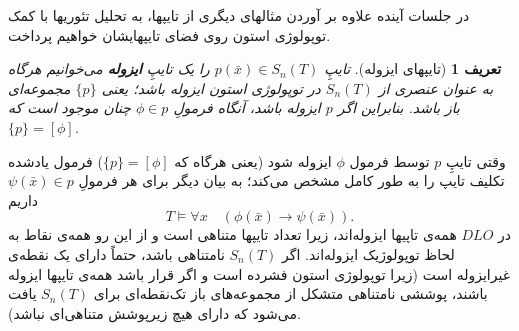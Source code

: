 \documentclass[12pt,a4paper]{report}
\theoremstyle{colorhead}
\newtheorem{defn}[thm]{تعریف}
\begin{document}
در جلسات آینده علاوه بر آوردن مثالهای دیگری از تایپها، به تحلیل تئوریها 
با کمک توپولوژی استون روی فضای تایپهایشان خواهیم پرداخت. 
\begin{defn}[تایپهای ایزوله]
تایپِ
$p(\bar{x})\in S_n(T)$
را یک تایپِ
\textbf{ایزوله}
می‌خوانیم هرگاه به عنوان عنصری از
$S_n(T)$
در توپولوژی استون ایزوله باشد؛ یعنی
$\{p\}$
مجموعه‌ای باز باشد. بنابراین اگر
$p$
ایزوله باشد، آنگاه فرمولِ
$\phi\in p$
چنان موجود است که 
$\{p\}=[\phi]$.
\end{defn}
وقتی تایپِ
$p$
توسط فرمول
$\phi$
ایزوله شود (یعنی هرگاه که 
$\{p\}=[\phi]$)
فرمول یادشده تکلیف تایپ را به طور کامل مشخص می‌کند؛ به بیان دیگر برای هر فرمولِ
$\psi(\bar{x})\in p$
داریم
\[
T\models \forall x\quad (\phi(\bar{x})\to \psi(\bar{x})).
\]
در
$DLO$
همه‌ی تاپیها ایزوله‌اند، زیرا تعداد تایپها متناهی است و از این رو همه‌ی نقاط به لحاظ توپولوژیک ایزوله‌اند. 
اگر
$S_n(T)$
نامتناهی باشد، حتماً دارای یک نقطه‌ی غیرایزوله است (زیرا توپولوژی استون فشرده است و اگر قرار باشد همه‌ی تایپها ایزوله باشند، پوششی نامتناهی  متشکل از 
مجموعه‌های باز تک‌نقطه‌ای برای
$S_n(T)$
یافت می‌شود که دارای هیچ‌ زیرپوشش متناهی‌ای نباشد).
\end{document}
